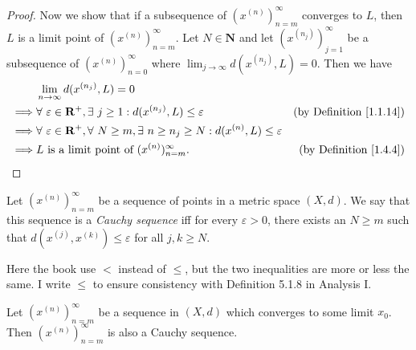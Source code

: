 \begin{proof}
    Now we show that if a subsequence of \((x^{(n)})_{n = m}^\infty\) converges to \(L\), then \(L\) is a limit point of \((x^{(n)})_{n = m}^\infty\).
    Let \(N \in \mathbf{N}\) and let \((x^{(n_j)})_{j = 1}^\infty\) be a subsequence of \((x^{(n)})_{n = 0}^\infty\) where \(\lim_{j \to \infty} d(x^{(n_j)}, L) = 0\).
    Then we have
    \begin{align*}
                 & \lim_{n \to \infty} d(x^{(n_j)}, L) = 0                                                                                                                      \\
        \implies & \forall\ \varepsilon \in \mathbf{R}^+, \exists\ j \geq 1 : d(x^{(n_j)}, L) \leq \varepsilon                            & \text{(by Definition \ref{1.1.14})} \\
        \implies & \forall\ \varepsilon \in \mathbf{R}^+,  \forall\ N \geq m, \exists\ n \geq n_j \geq N : d(x^{(n)}, L) \leq \varepsilon                                       \\
        \implies & L \text{ is a limit point of } (x^{(n)})_{n = m}^\infty.                                                               & \text{(by Definition \ref{1.4.4})}
    \end{align*}
\end{proof}

\begin{definition}\label{1.4.6}
    Let \((x^{(n)})_{n = m}^\infty\) be a sequence of points in a metric space \((X, d)\).
    We say that this sequence is a \emph{Cauchy sequence} iff for every \(\varepsilon > 0\), there exists an \(N \geq m\) such that \(d(x^{(j)}, x^{(k)}) \leq \varepsilon\) for all \(j, k \geq N\).
\end{definition}

\begin{note}
    Here the book use \(<\) instead of \(\leq\), but the two inequalities are more or less the same.
    I write \(\leq\) to ensure consistency with Definition 5.1.8 in Analysis I.
\end{note}

\begin{lemma}\label{1.4.7}
    Let \((x^{(n)})_{n = m}^\infty\) be a sequence in \((X, d)\) which converges to some limit \(x_0\).
    Then \((x^{(n)})_{n = m}^\infty\) is also a Cauchy sequence.
\end{lemma}


